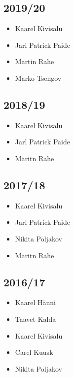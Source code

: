 \documentclass[a4paper,11pt,twocolumn]{article}
\begin{document}
\subsection{2019/20}
\begin{itemize}
    \item Kaarel Kivisalu
    \item Jarl Patrick Paide
    \item Martin Rahe
    \item Marko Tsengov
\end{itemize}

\subsection{2018/19}
\begin{itemize}
    \item Kaarel Kivisalu
    \item Jarl Patrick Paide
    \item Maritn Rahe
\end{itemize}

\subsection{2017/18}
\begin{itemize}
    \item Kaarel Kivisalu
    \item Jarl Patrick Paide
    \item Nikita Poljakov
    \item Maritn Rahe
\end{itemize}

\subsection{2016/17}
\begin{itemize}
    \item Kaarel Hänni
    \item Taavet Kalda
    \item Kaarel Kivisalu
    \item Carel Kuusk
    \item Nikita Poljakov
\end{itemize}
\end{document}
